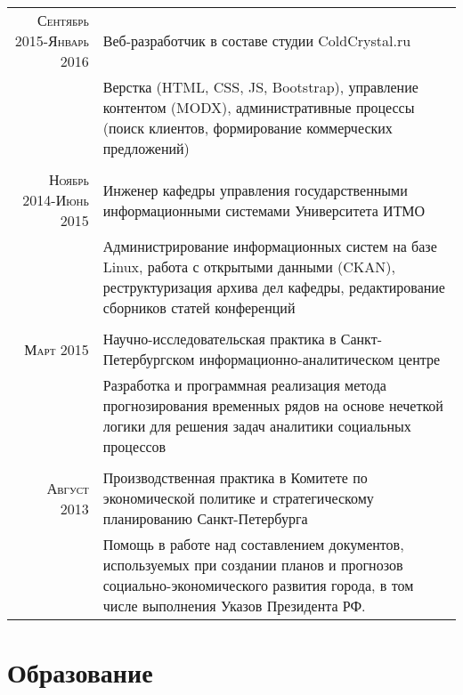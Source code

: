 \documentclass[a4paper,10pt]{article} %
\begin{document}
\begin{tabular}{r|p{11cm}}
    \textsc{Сентябрь 2015-Январь 2016} & Веб-разработчик в составе студии
    ColdCrystal.ru\\
    & \footnotesize{Верстка (HTML, CSS, JS, Bootstrap), управление контентом
        (MODX), административные процессы (поиск клиентов, формирование
        коммерческих предложений)}\\
\multicolumn{2}{c}{} \\
    \textsc{Ноябрь 2014-Июнь 2015} & Инженер кафедры управления государственными
    информационными системами Университета ИТМО\\
    & \footnotesize{Администрирование информационных систем на базе Linux,
        работа с открытыми данными (CKAN), реструктуризация архива дел кафедры,
        редактирование сборников статей конференций}\\
\multicolumn{2}{c}{} \\
\textsc{Март 2015} & Научно-исследовательская практика в Санкт-Петербургском
информационно-аналитическом центре\\
& \footnotesize{Разработка и программная реализация метода прогнозирования временных рядов на основе нечеткой
    логики для решения задач аналитики социальных процессов}\\
\multicolumn{2}{c}{} \\


\textsc{Август 2013} & Производственная практика в Комитете по экономической политике и
стратегическому планированию Санкт-Петербурга \\
& \footnotesize{Помощь в работе над составлением документов, используемых при
    создании
    планов и прогнозов социально-экономического развития города, в том числе выполнения Указов Президента РФ.}
\end{tabular}


\section{Образование}
\end{document}
